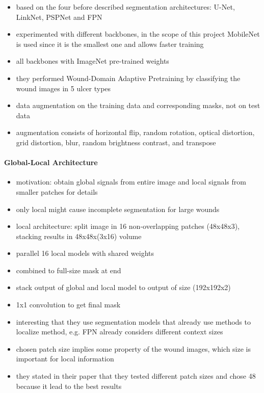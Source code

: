 \begin{itemize}
	\item based on the four before described segmentation architectures: U-Net, LinkNet, PSPNet and FPN
	\item experimented with different backbones, in the scope of this project MobileNet \cite{howard2017mobilenets} is used since it is the smallest one and allows faster training
	\item all backbones with ImageNet pre-trained weights
	\item they performed Wound-Domain Adaptive Pretraining by classifying the wound images in 5 ulcer types
	\item data augmentation on the training data and corresponding masks, not on test data
	\item augmentation consists of horizontal flip, random rotation, optical distortion, grid distortion, blur, random brightness contrast, and transpose
\end{itemize}

\paragraph{Global-Local Architecture}

\begin{itemize}
	\item motivation: obtain global signals from entire image and local signals from smaller patches for details
	\item only local might cause incomplete segmentation for large wounds
	\item local architecture: split image in 16 non-overlapping patches (48x48x3), stacking results in 48x48x(3x16) volume
	\item parallel 16 local models with shared weights
	\item combined to full-size mask at end
	\item stack output of global and local model to output of size (192x192x2)
	\item 1x1 convolution to get final mask
\end{itemize}

\begin{itemize}
	\item interesting that they use segmentation models that already use methods to localize method, e.g. FPN already considers different context sizes
	\item chosen patch size implies some property of the wound images, which size is important for local information
	\item they stated in their paper that they tested different patch sizes and chose 48 because it lead to the best results
\end{itemize}


